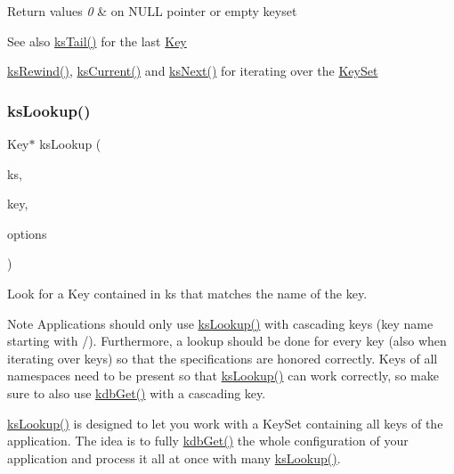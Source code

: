 \begin{DoxyRetVals}{Return values}
{\em 0} & on N\+U\+LL pointer or empty keyset \\
\hline
\end{DoxyRetVals}
\begin{DoxySeeAlso}{See also}
\hyperlink{group__keyset_gadca442c4ab43cf532b15091d7711559e}{ks\+Tail()} for the last \hyperlink{group__key}{Key} 

\hyperlink{group__keyset_gabe793ff51f1728e3429c84a8a9086b70}{ks\+Rewind()}, \hyperlink{group__keyset_ga4287b9416912c5f2ab9c195cb74fb094}{ks\+Current()} and \hyperlink{group__keyset_ga317321c9065b5a4b3e33fe1c399bcec9}{ks\+Next()} for iterating over the \hyperlink{group__keyset}{Key\+Set} 
\end{DoxySeeAlso}
\mbox{\label{group__keyset_ga60f1ddcf23272f2b29b90e92ebe9b56f}} 
\subsubsection{\texorpdfstring{ks\+Lookup()}{ksLookup()}}
{\footnotesize\ttfamily Key$\ast$ ks\+Lookup (\begin{DoxyParamCaption}\item[{Key\+Set $\ast$}]{ks,  }\item[{Key $\ast$}]{key,  }\item[{\hyperlink{group__keyset_gada05f4bbf46fde81d0d57df86e73d914}{elektra\+Lookup\+Flags}}]{options }\end{DoxyParamCaption})}



Look for a Key contained in {\ttfamily ks} that matches the name of the {\ttfamily key}. 

\begin{DoxyNote}{Note}
Applications should only use \hyperlink{group__keyset_ga60f1ddcf23272f2b29b90e92ebe9b56f}{ks\+Lookup()} with cascading keys (key name starting with {\ttfamily /}). Furthermore, a lookup should be done for every key (also when iterating over keys) so that the specifications are honored correctly. Keys of all namespaces need to be present so that \hyperlink{group__keyset_ga60f1ddcf23272f2b29b90e92ebe9b56f}{ks\+Lookup()} can work correctly, so make sure to also use \hyperlink{group__kdb_ga28e385fd9cb7ccfe0b2f1ed2f62453a1}{kdb\+Get()} with a cascading key.
\end{DoxyNote}
{\ttfamily \hyperlink{group__keyset_ga60f1ddcf23272f2b29b90e92ebe9b56f}{ks\+Lookup()}} is designed to let you work with a Key\+Set containing all keys of the application. The idea is to fully \hyperlink{group__kdb_ga28e385fd9cb7ccfe0b2f1ed2f62453a1}{kdb\+Get()} the whole configuration of your application and process it all at once with many {\ttfamily \hyperlink{group__keyset_ga60f1ddcf23272f2b29b90e92ebe9b56f}{ks\+Lookup()}}.

